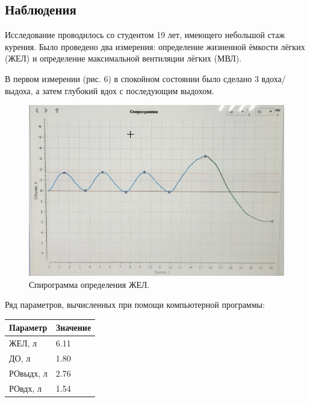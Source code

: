 \documentclass{article}
\begin{document}
        \subsection*{Наблюдения}
            
            \hspace*{4mm} Исследование проводилось со студентом 19 лет, имеющего небольшой стаж курения.
            Было проведено два измерения: определение жизненной ёмкости лёгких (ЖЕЛ) и 
            определение максимальной вентиляции лёгких (МВЛ).
            \vspace*{4mm}

            В первом измерении (рис. 6) в спокойном состоянии было сделано 3 вдоха/выдоха, а затем
            глубокий вдох с последующим выдохом.
            \vspace*{4mm}

            \begin{figure}[h]
                \centering
                \includegraphics*[width=\textwidth]{ЖЕЛ.jpg}
                \caption{Спирограмма определения ЖЕЛ.}
            \end{figure}

            Ряд параметров, вычисленных при помощи компьютерной программы:

            \begin{center}
                \begin{tabular}{|l|l|}
                    \hline
                    Параметр & Значение \\ \hline
                    ЖЕЛ, л & 6.11 \\ \hline
                    ДО, л & 1.80 \\ \hline
                    РО{выдх}, л & 2.76 \\ \hline
                    РО{вдх}, л & 1.54  \\ \hline
                \end{tabular}
            \end{center}
\end{document}
